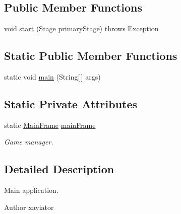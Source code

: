 \subsection*{Public Member Functions}
\begin{DoxyCompactItemize}
\item 
void \hyperlink{classbattleship2D_1_1ui_1_1BattleShip2D_a821e6c85587d58945cc3bd511c575ebd}{start} (Stage primary\-Stage)  throws Exception 
\end{DoxyCompactItemize}
\subsection*{Static Public Member Functions}
\begin{DoxyCompactItemize}
\item 
static void \hyperlink{classbattleship2D_1_1ui_1_1BattleShip2D_a219a7545c00befc922033811cfe90e1c}{main} (String\mbox{[}$\,$\mbox{]} args)
\end{DoxyCompactItemize}
\subsection*{Static Private Attributes}
\begin{DoxyCompactItemize}
\item 
static \hyperlink{classbattleship2D_1_1ui_1_1MainFrame}{Main\-Frame} \hyperlink{classbattleship2D_1_1ui_1_1BattleShip2D_ac38581621040198f7174cd8738f91890}{main\-Frame}
\begin{DoxyCompactList}\small\item\em Game manager. \end{DoxyCompactList}\end{DoxyCompactItemize}


\subsection{Detailed Description}
Main application. 

\begin{DoxyAuthor}{Author}
xaviator 
\end{DoxyAuthor}


